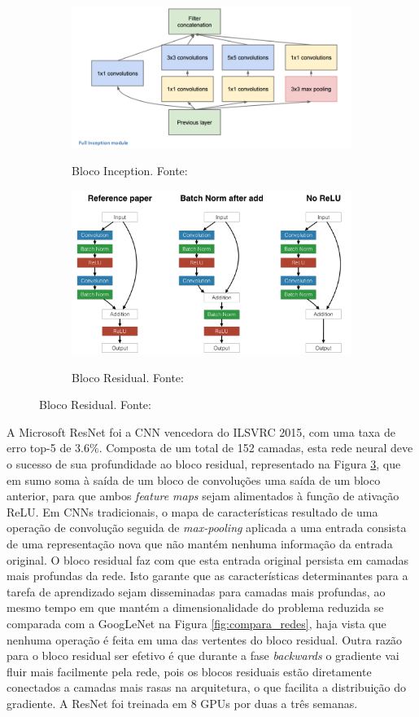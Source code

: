 \begin{figure}
	\begin{subfigure}[h]{0.5\linewidth}
		\centering
		\caption{Bloco Inception. Fonte: \cite{9dlpapers}}
		\includegraphics[width=0.7\linewidth]{img/GoogLeNet}
		\label{fig:bloco_inception}
	\end{subfigure}
	\begin{subfigure}[h]{0.5\linewidth}
		\centering
		\caption{Bloco Residual. Fonte: \cite{torch:resnet}}
		\includegraphics[width=0.7\linewidth]{img/resnets_modelvariants}
		\label{fig:bloco_residual}
	\end{subfigure} %
\end{figure}

A Microsoft ResNet foi a CNN vencedora do ILSVRC 2015, com uma taxa de erro top-5 de $3.6\%$. Composta de um total de 152 camadas, esta rede neural deve o sucesso de sua profundidade ao bloco residual, representado na Figura \ref{fig:bloco_residual}, que em sumo soma à saída de um bloco de convoluções uma saída de um bloco anterior, para que ambos \emph{feature maps} sejam alimentados à função de ativação ReLU. Em CNNs tradicionais, o mapa de características resultado de uma operação de convolução seguida de \emph{max-pooling} aplicada a uma entrada consista de uma representação nova que não mantém nenhuma informação da entrada original. O bloco residual faz com que esta entrada original persista em camadas mais profundas da rede. Isto garante que as características determinantes para a tarefa de aprendizado sejam disseminadas para camadas mais profundas, ao mesmo tempo em que mantém a dimensionalidade do problema reduzida se comparada com a GoogLeNet na Figura \ref{fig:compara_redes}, haja vista que nenhuma operação é feita em uma das vertentes do bloco residual. Outra razão para o bloco residual ser efetivo é que durante a fase \emph{backwards} o gradiente vai fluir mais facilmente pela rede, pois os blocos residuais estão diretamente conectados a camadas mais rasas na arquitetura, o que facilita a distribuição do gradiente. A ResNet foi treinada em 8 GPUs por duas a três semanas.

